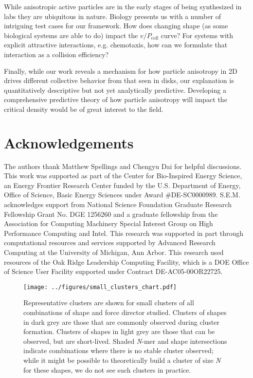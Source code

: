 While anisotropic active particles are in the early stages of being synthesized in labs they are ubiquitous in nature.
Biology presents us with a number of intriguing test cases for our framework.
How does changing shape (as some biological systems are able to do) impact the $v/P_\text{coll}$ curve?
For systems with explicit attractive interactions, e.g. chemotaxis, how can we formulate that interaction as a collision efficiency?

Finally, while our work reveals a mechanism for how particle anisotropy in 2D drives different collective behavior from that seen in disks, our explanation is quantitatively descriptive but not yet analytically predictive.
Developing a comprehensive predictive theory of how particle anisotropy will impact the critical density would be of great interest to the field.

\section*{Acknowledgements}
The authors thank Matthew Spellings and Chengyu Dai for helpful discussions.
This work was supported as part of the Center for Bio-Inspired Energy Science, an Energy Frontier Research Center funded by the U.S. Department of Energy, Office of Science, Basic Energy Sciences under Award {\#}DE-SC0000989.
S.E.M. acknowledges support from National Science Foundation Graduate Research Fellowship Grant No. DGE 1256260 and a graduate fellowship from the Association for Computing Machinery Special Interest Group on High Performance Computing and Intel.
This research was supported in part through computational resources and services supported by Advanced Research Computing at the University of Michigan, Ann Arbor.
This research used resources of the Oak Ridge Leadership Computing Facility, which is a DOE Office of Science User Facility supported under Contract DE-AC05-00OR22725.


\begin{figure}[H]
\begin{center}
\texttt{[image: ../figures/small\_clusters\_chart.pdf]}
\caption{
Representative clusters are shown for small clusters of all combinations of shape and force director studied.
Clusters of shapes in dark grey are those that are commonly observed during cluster formation.
Clusters of shapes in light grey are those that can be observed, but are short-lived.
Shaded \textit{N}-mer and shape intersections indicate combinations where there is no stable cluster observed; while it might be possible to theoretically build a cluster of size \textit{N} for these shapes, we do not see such clusters in practice.
}
\label{fig:SI_clusters}
\end{center}
\end{figure}

